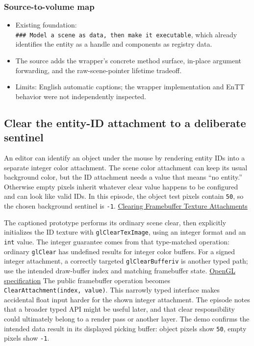 \subsubsection{Source-to-volume map}\label{06-engine-ii-ch031-source-to-volume-map-1}

\begin{itemize}
\tightlist
\item
  Existing foundation: \texttt{\#\#\#\ Model\ a\ scene\ as\ data,\ then\ make\ it\ executable}, which already identifies the entity as a handle and components as registry data.
\item
  The source adds the wrapper's concrete method surface, in-place argument forwarding, and the raw-scene-pointer lifetime tradeoff.
\item
  Limits: English automatic captions; the wrapper implementation and EnTT behavior were not independently inspected.
\end{itemize}

\subsection{Clear the entity-ID attachment to a deliberate sentinel}\label{06-engine-ii-ch031-clear-the-entity-id-attachment-to-a-deliberate-sentinel}

An editor can identify an object under the mouse by rendering entity IDs into a separate integer color attachment. The scene color attachment can keep its usual background color, but the ID attachment needs a value that means ``no entity.'' Otherwise empty pixels inherit whatever clear value happens to be configured and can look like valid IDs. In this episode, the object test pixels contain \texttt{50}, so the chosen background sentinel is \texttt{-1}. \href{https://www.youtube.com/watch?v=LPhBiIvDOs0}{Clearing Framebuffer Texture Attachments}

The captioned prototype performs its ordinary scene clear, then explicitly initializes the ID texture with \texttt{glClearTexImage}, using an integer format and an \texttt{int} value. The integer guarantee comes from that type-matched operation: ordinary \texttt{glClear} has undefined results for integer color buffers. For a signed integer attachment, a correctly targeted \texttt{glClearBufferiv} is another typed path; use the intended draw-buffer index and matching framebuffer state. \href{https://registry.khronos.org/OpenGL/specs/gl/glspec30.pdf}{OpenGL specification} The public framebuffer operation becomes \texttt{ClearAttachment(index,\ value)}. This narrowly typed interface makes accidental float input harder for the shown integer attachment. The episode notes that a broader typed API might be useful later, and that clear responsibility could ultimately belong to a render pass or another layer. The demo confirms the intended data result in its displayed picking buffer: object pixels show \texttt{50}, empty pixels show \texttt{-1}.

